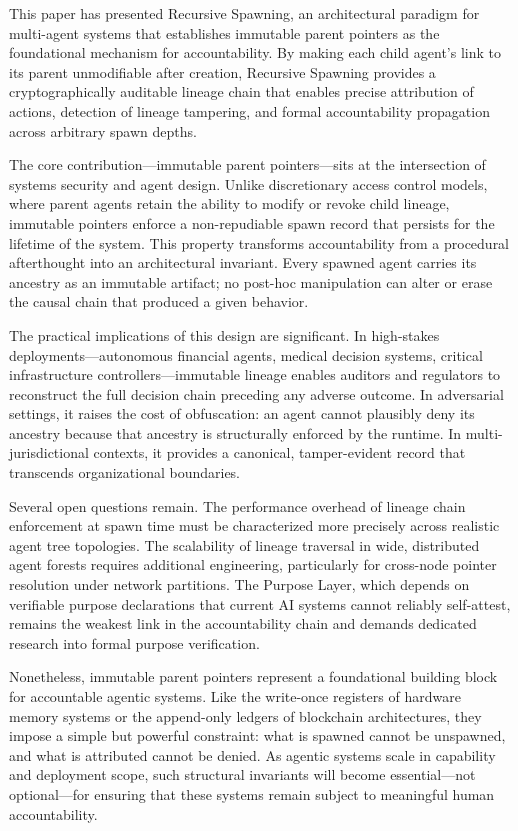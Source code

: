 This paper has presented Recursive Spawning, an architectural paradigm for multi-agent systems that establishes immutable parent pointers as the foundational mechanism for accountability. By making each child agent's link to its parent unmodifiable after creation, Recursive Spawning provides a cryptographically auditable lineage chain that enables precise attribution of actions, detection of lineage tampering, and formal accountability propagation across arbitrary spawn depths.

The core contribution—immutable parent pointers—sits at the intersection of systems security and agent design. Unlike discretionary access control models, where parent agents retain the ability to modify or revoke child lineage, immutable pointers enforce a non-repudiable spawn record that persists for the lifetime of the system. This property transforms accountability from a procedural afterthought into an architectural invariant. Every spawned agent carries its ancestry as an immutable artifact; no post-hoc manipulation can alter or erase the causal chain that produced a given behavior.

The practical implications of this design are significant. In high-stakes deployments—autonomous financial agents, medical decision systems, critical infrastructure controllers—immutable lineage enables auditors and regulators to reconstruct the full decision chain preceding any adverse outcome. In adversarial settings, it raises the cost of obfuscation: an agent cannot plausibly deny its ancestry because that ancestry is structurally enforced by the runtime. In multi-jurisdictional contexts, it provides a canonical, tamper-evident record that transcends organizational boundaries.

Several open questions remain. The performance overhead of lineage chain enforcement at spawn time must be characterized more precisely across realistic agent tree topologies. The scalability of lineage traversal in wide, distributed agent forests requires additional engineering, particularly for cross-node pointer resolution under network partitions. The Purpose Layer, which depends on verifiable purpose declarations that current AI systems cannot reliably self-attest, remains the weakest link in the accountability chain and demands dedicated research into formal purpose verification.

Nonetheless, immutable parent pointers represent a foundational building block for accountable agentic systems. Like the write-once registers of hardware memory systems or the append-only ledgers of blockchain architectures, they impose a simple but powerful constraint: what is spawned cannot be unspawned, and what is attributed cannot be denied. As agentic systems scale in capability and deployment scope, such structural invariants will become essential—not optional—for ensuring that these systems remain subject to meaningful human accountability.


